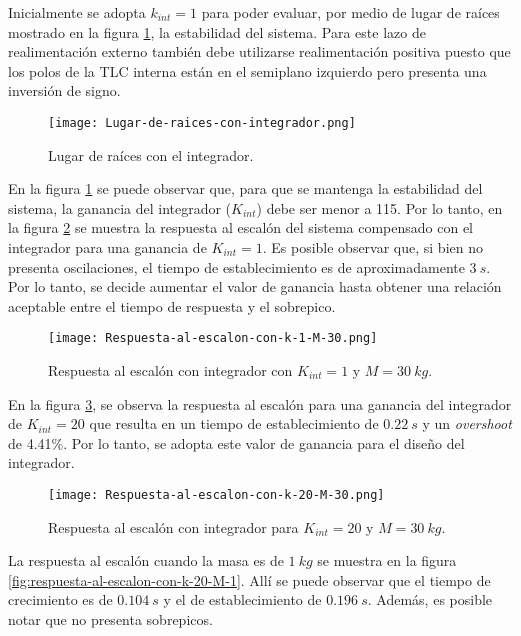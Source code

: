 \noindent Inicialmente se adopta $k_{int} = 1$ para poder evaluar, por medio de lugar de ra\'{i}ces mostrado en la figura \ref{fig:lugar-de-raices-con-integrador}, la estabilidad del sistema. Para este lazo de realimentaci\'{o}n externo tambi\'{e}n debe utilizarse realimentaci\'{o}n positiva puesto que los polos de la TLC interna est\'{a}n en el semiplano izquierdo pero presenta una inversi\'{o}n de signo.


\begin{figure}[H]
	\centering
	\texttt{[image: Lugar-de-raices-con-integrador.png]}
	\caption{Lugar de raíces con el integrador.}
	\label{fig:lugar-de-raices-con-integrador}
\end{figure}


\noindent En la figura \ref{fig:lugar-de-raices-con-integrador} se puede observar que, para que se mantenga la estabilidad del sistema, la ganancia del integrador ($K_{int}$) debe ser menor a 115. Por lo tanto, en la figura \ref{fig:respuesta-al-escalon-con-k-1-M-30} se muestra la respuesta al escal\'{o}n del sistema compensado con el integrador para una ganancia de $K_{int}=1$.  Es posible observar que, si bien no presenta oscilaciones, el tiempo de establecimiento es de aproximadamente $3\:s$. Por lo tanto, se decide aumentar el valor de ganancia hasta obtener una relaci\'{o}n aceptable entre el tiempo de respuesta y el sobrepico.


\begin{figure}[H]
	\centering
	\texttt{[image: Respuesta-al-escalon-con-k-1-M-30.png]}
	\caption{Respuesta al escalón con integrador con $K_{int} =1$ y $M=30\:kg$.}
	\label{fig:respuesta-al-escalon-con-k-1-M-30}
\end{figure}


\noindent En la figura \ref{fig:respuesta-al-escalon-con-k-20-M-30}, se observa la respuesta al escal\'{o}n para una ganancia del integrador de $K_{int}=20$ que resulta en un tiempo de establecimiento de $0.22\:s$ y un \textsl{overshoot} de 4.41\%. Por lo tanto, se adopta este valor de ganancia para el dise\~{n}o del integrador.

\begin{figure}[H]
	\centering
	\texttt{[image: Respuesta-al-escalon-con-k-20-M-30.png]}
	\caption{Respuesta al escalón con integrador para $K_{int} =20$ y $M = 30\:kg$.}
	\label{fig:respuesta-al-escalon-con-k-20-M-30}
\end{figure}


\noindent La respuesta al escal\'{o}n cuando la masa es de $1\:kg$ se muestra en la figura \ref{fig:respuesta-al-escalon-con-k-20-M-1}. All\'{i} se puede observar que el tiempo de crecimiento es de $0.104\:s$ y el de establecimiento de $0.196\:s$. Adem\'{a}s, es posible notar que no presenta sobrepicos.



